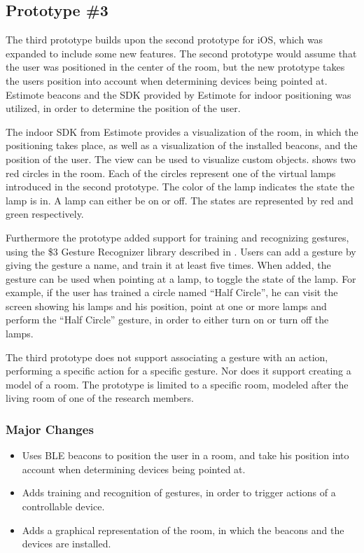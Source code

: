 \FloatBarrier
\subsection{Prototype \#3}
\label{sec:implementation:prototypes:prototype3}

The third prototype builds upon the second prototype for iOS, 
which was expanded to include some new features. 
The second prototype would assume that the user was positioned in the center of the room, 
but the new prototype takes the users position into account when determining devices being pointed at. 
Estimote beacons and the SDK provided by Estimote for indoor positioning was utilized, 
in order to determine the position of the user.

The indoor SDK from Estimote provides a visualization of the room, 
in which the positioning takes place, 
as well as a visualization of the installed beacons, 
and the position of the user. 
The view can be used to visualize custom objects. 
 shows two red circles in the room. 
Each of the circles represent one of the virtual lamps introduced in the second prototype. 
The color of the lamp indicates the state the lamp is in. 
A lamp can either be on or off. 
The states are represented by red and green respectively.

Furthermore the prototype added support for training and recognizing gestures, 
using the \$3 Gesture Recognizer library described in .
Users can add a gesture by giving the gesture a name, 
and train it at least five times. 
When added, the gesture can be used when pointing at a lamp, 
to toggle the state of the lamp. 
For example, if the user has trained a circle named ``Half Circle'', 
he can visit the screen showing his lamps and his position, 
point at one or more lamps and perform the ``Half Circle'' gesture, 
in order to either turn on or turn off the lamps.

The third prototype does not support associating a gesture with an action, 
\ie performing a specific action for a specific gesture. 
Nor does it support creating a model of a room. 
The prototype is limited to a specific room, 
modeled after the living room of one of the research members.

\subsubsection{Major Changes}
\begin{itemize}
\item Uses BLE beacons to position the user in a room, and take his position into account when determining devices being pointed at.
\item Adds training and recognition of gestures, in order to trigger actions of a controllable device.
\item Adds a graphical representation of the room, in which the beacons and the devices are installed.
\end{itemize}

